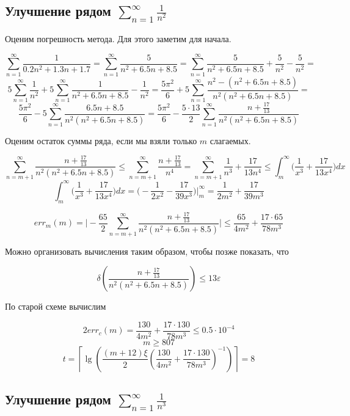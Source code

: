 \documentclass[11pt,a4paper,oneside]{article}
\begin{document}
\subsection{Улучшение рядом $ \sum_{n = 1}^{\infty} \frac{1}{n^2} $}
	
Оценим погрешность метода. Для этого заметим для начала.

$$ \sum_{n = 1}^{\infty} \frac{1}{0.2n^2 + 1.3n + 1.7} =
	\sum_{n = 1}^{\infty} \frac{5}{n^2 + 6.5n + 8.5} =
	\sum_{n = 1}^{\infty} \frac{5}{n^2 + 6.5n + 8.5} + \frac{5}{n^2} - \frac{5}{n^2} = $$
$$ 5 \sum_{n = 1}^{\infty} \frac{1}{n^2} +
	5 \sum_{n = 1}^{\infty} \frac{1}{n^2 + 6.5n + 8.5} - \frac{1}{n^2} = 
	\frac{5\pi^2}{6} +
	5 \sum_{n = 1}^{\infty} \frac{n^2 - (n^2 + 6.5n + 8.5)}{n^2 (n^2 + 6.5n + 8.5)} = $$
$$ \frac{5\pi^2}{6} -
	5 \sum_{n = 1}^{\infty} \frac{6.5n + 8.5}{n^2 (n^2 + 6.5n + 8.5)} = 
	\frac{5\pi^2}{6} -
	\frac{5 \cdot 13}{2} \sum_{n = 1}^{\infty} \frac{n + \frac{17}{13}}{n^2 (n^2 + 6.5n + 8.5)}$$
	
Оценим остаток суммы ряда, если мы взяли только $m$ слагаемых.

$$ \sum_{n = m + 1}^{\infty} \frac{n + \frac{17}{13}}{n^2 (n^2 + 6.5n + 8.5)} \le
	\sum_{n = m + 1}^{\infty} \frac{n + \frac{17}{13}}{n^4} = 
	\sum_{n = m + 1}^{\infty} \frac{1}{n^3} + \frac{17}{13 n^4} \le
	\int_{m}^{\infty} \biggr(\frac{1}{x^3} + \frac{17}{13 x^4}\biggr)dx $$
$$ \int_{m}^{\infty} \biggr(\frac{1}{x^3} + \frac{17}{13 x^4}\biggr) dx
	= \biggr( - \frac{1}{2x^2} - \frac{17}{39 x^3} \biggr) \biggr|_{m}^{\infty} =
	\frac{1}{2 m^2} + \frac{17}{39 m^3} $$
	
$$ err_{m}(m) =
	\biggr|-\frac{65}{2} \sum_{n = m + 1}^{\infty}
		\frac{n + \frac{17}{13}}{n^2 (n^2 + 6.5n + 8.5)}\biggr| \le
	\frac{65}{4m^2} + \frac{17 \cdot 65}{78m^3} $$
	
Можно организовать вычисления таким образом, чтобы позже показать, что

$$ \delta \left( \frac{n + \frac{17}{13}}{n^2 (n^2 + 6.5n + 8.5)} \right) \le 13 \varepsilon $$
	
По старой схеме вычислим

$$ 2 err_{c}(m) = \frac{130}{4m^2} + \frac{17 \cdot 130}{78m^3} \le 0.5 \cdot 10^{-4} $$
$$ m \ge 807 $$
$$ t = \left\lceil \lg\left(
	\frac{(m + 12)\xi}{2} \left(
		\frac{130}{4m^2} + \frac{17 \cdot 130}{78m^3} \right)^{-1} \right) \right\rceil = 8 $$
	
\subsection{Улучшение рядом $ \sum_{n = 1}^{\infty} \frac{1}{n^3} $}
	
\end{document}
